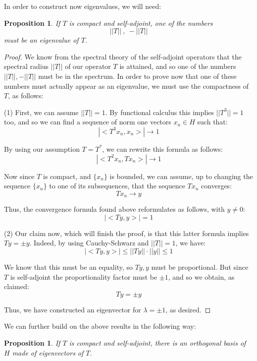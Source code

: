 \documentclass[12pt]{amsbook}
\newtheorem{proposition}[theorem]{Proposition}
\begin{document}
In order to construct now eigenvalues, we will need:

\begin{proposition}
If $T$ is compact and self-adjoint, one of the numbers 
$$||T||\ ,\ -||T||$$
must be an eigenvalue of $T$.
\end{proposition}

\begin{proof}
We know from the spectral theory of the self-adjoint operators that the spectral radius $||T||$ of our operator $T$ is attained, and so one of the numbers $||T||,-||T||$ must be in the spectrum. In order to prove now that one of these numbers must actually appear as an eigenvalue, we must use the compactness of $T$, as follows:

\medskip

(1) First, we can assume $||T||=1$. By functional calculus this implies $||T^3||=1$ too, and so we can find a sequence of norm one vectors $x_n\in H$ such that:
$$|<T^3x_n,x_n>|\to1$$

By using our assumption $T=T^*$, we can rewrite this formula as follows:
$$|<T^2x_n,Tx_n>|\to1$$

Now since $T$ is compact, and $\{x_n\}$ is bounded, we can assume, up to changing the sequence $\{x_n\}$ to one of its subsequences, that the sequence $Tx_n$ converges:
$$Tx_n\to y$$

Thus, the convergence formula found above reformulates as follows, with $y\neq0$:
$$|<Ty,y>|=1$$

(2) Our claim now, which will finish the proof, is that this latter formula implies $Ty=\pm y$. Indeed, by using Cauchy-Schwarz and $||T||=1$, we have:
$$|<Ty,y>|\leq||Ty||\cdot||y||\leq1$$

We know that this must be an equality, so $Ty,y$ must be proportional. But since $T$ is self-adjoint the proportionality factor must be $\pm1$, and so we obtain, as claimed:
$$Ty=\pm y$$

Thus, we have constructed an eigenvector for $\lambda=\pm1$, as desired.
\end{proof}

We can further build on the above results in the following way:


\begin{proposition}
If $T$ is compact and self-adjoint, there is an orthogonal basis of $H$ made of eigenvectors of $T$.
\end{proposition}
\end{document}
